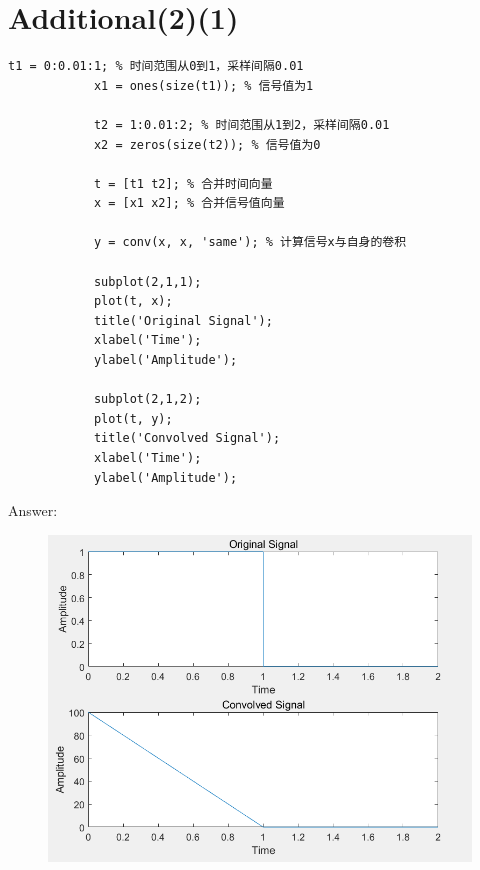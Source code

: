 \documentclass{article}
\begin{document}
    \section*{Additional(2)(1)}
        \begin{lstlisting}[caption={题Additional(2)(1)MATLAB代码}, label={lst:matlab}]
            t1 = 0:0.01:1; % 时间范围从0到1，采样间隔0.01
            x1 = ones(size(t1)); % 信号值为1

            t2 = 1:0.01:2; % 时间范围从1到2，采样间隔0.01
            x2 = zeros(size(t2)); % 信号值为0

            t = [t1 t2]; % 合并时间向量
            x = [x1 x2]; % 合并信号值向量

            y = conv(x, x, 'same'); % 计算信号x与自身的卷积

            subplot(2,1,1);
            plot(t, x);
            title('Original Signal');
            xlabel('Time');
            ylabel('Amplitude');

            subplot(2,1,2);
            plot(t, y);
            title('Convolved Signal');
            xlabel('Time');
            ylabel('Amplitude');

        \end{lstlisting}
        Answer: 
            \begin{figure}[h]
                \includegraphics{additional_1.png}
            \end{figure}
            \FloatBarrier
\end{document}
